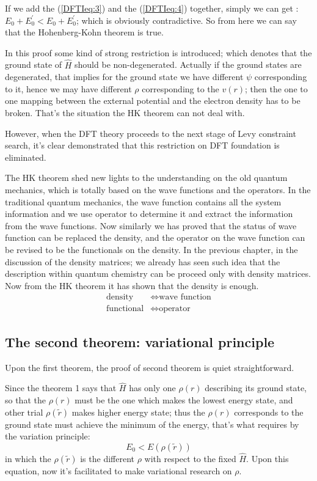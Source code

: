 If we add the (\ref{DFTIeq:3}) and the (\ref{DFTIeq:4}) together,
simply we can get :$ E_{0}+E_{0}^{'} < E_{0}+E_{0}^{'} $; which is
obviously contradictive. So from here we can say that the
Hohenberg-Kohn theorem is true.

In this proof some kind of strong restriction is introduced; which
denotes that the ground state of $\hat{H}$ should be
non-degenerated. Actually if the ground states are degenerated, that
implies for the ground state we have different $\psi$ corresponding to
it, hence we may have different $\rho$ corresponding to the $v(r)$;
then the one to one mapping between the external potential and the
electron density has to be broken. That's the situation the HK theorem
can not deal with.

However, when the DFT theory proceeds to the next stage of Levy
constraint search, it's clear demonstrated that this restriction on
DFT foundation is eliminated.

The HK theorem shed new lights to the understanding on the old
quantum mechanics, which is totally based on the wave functions and
the operators. In the traditional quantum mechanics, the wave
function contains all the system information and we use operator to
determine it and extract the information from the wave functions.
Now similarly we has proved that the status of wave function can be
replaced the density, and the operator on the wave function can be
revised to be the functionals on the density. In the previous
chapter, in the discussion of the density matrices; we already has
seen such idea that the description within quantum chemistry can be
proceed only with density matrices. Now from the HK theorem it has
shown that the density is enough.
\begin{align}\label{}
  \text{density} &\Leftrightarrow \text{wave function} \nonumber \\
  \text{functional} &\Leftrightarrow \text{operator}
\end{align}


\subsection{The second theorem: variational principle}

Upon the first theorem, the proof of second theorem\cite{HK1} is quiet
straightforward.

Since the theorem 1 says that $\hat{H}$ has only one $\rho(r)$
describing its ground state, so that the $\rho(r)$ must be the one
which makes the lowest energy state, and other trial $\rho(\tilde{r})$
makes higher energy state; thus the $\rho(r)$ corresponds to the
ground state must achieve the minimum of the energy, that's what
requires by the variation principle:
\begin{equation}\label{}
  E_{0}< E(\rho(\tilde{r}))
\end{equation}
in which the $\rho(\tilde{r})$ is the different $\rho$ with respect to
the fixed $\hat{H}$. Upon this equation, now it's facilitated to make
variational research on $\rho$.


